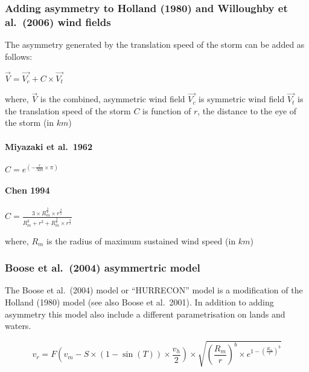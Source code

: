 \documentclass[
]{article}
\begin{document}
\hypertarget{adding-asymmetry-to-holland-1980-and-willoughby-et-al.-2006-wind-fields}{%
\subsubsection{Adding asymmetry to Holland (1980) and Willoughby et
al.~(2006) wind
fields}\label{adding-asymmetry-to-holland-1980-and-willoughby-et-al.-2006-wind-fields}}

The asymmetry generated by the translation speed of the storm can be
added as follows:

\(\vec{V} = \vec{V_c} + C \times \vec{V_t}\)

where, \(\vec{V}\) is the combined, asymmetric wind field \(\vec{V_c}\)
is symmetric wind field \(\vec{V_t}\) is the translation speed of the
storm \(C\) is function of \(r\), the distance to the eye of the storm
(in \(km\))

\hypertarget{miyazaki-et-al.-1962}{%
\paragraph{Miyazaki et al.~1962}\label{miyazaki-et-al.-1962}}

\(C = e^{(-\frac{r}{500} \times \pi)}\)

\hypertarget{chen-1994}{%
\paragraph{Chen 1994}\label{chen-1994}}

\(C = \frac{3 \times R_m^{\frac{3}{2}} \times r^{\frac{3}{2}}}{R_m^3 + r^3 +R_m^{\frac{3}{2}} \times r^{\frac{3}{2}}}\)

where, \(R_m\) is the radius of maximum sustained wind speed (in \(km\))

\hypertarget{boose-et-al.-2004-asymmertric-model}{%
\subsubsection{Boose et al.~(2004) asymmertric
model}\label{boose-et-al.-2004-asymmertric-model}}

The Boose et al.~(2004) model or ``HURRECON'' model is a modification of
the Holland (1980) model (see also Boose et al.~2001). In addition to
adding asymmetry this model also include a different parametrisation on
lands and waters.

\[
v_r = F\left(v_m - S \times (1 - \sin(T)) \times \frac{v_h}{2} \right) \times \sqrt{\left(\frac{R_m}{r}\right)^b \times e^{1 - \left(\frac{R_m}{r}\right)^b}}
\]
\end{document}

